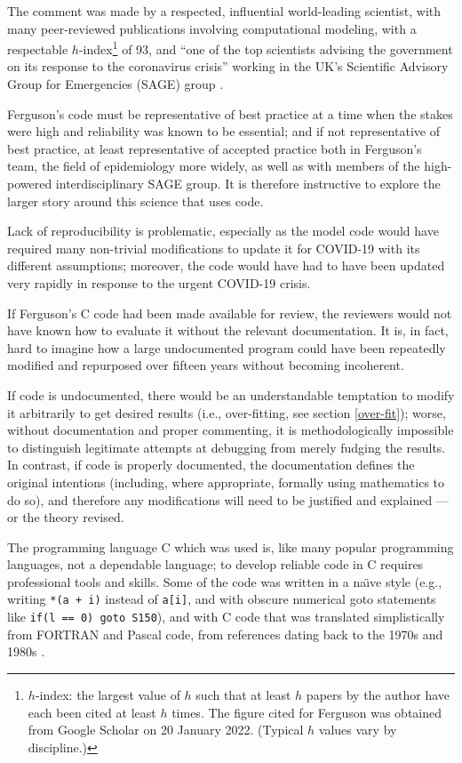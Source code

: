 \documentclass{comjnl}
\begin{document}
The comment was made by a respected, influential world-leading scientist, with many peer-reviewed publications involving computational modeling, with a respectable $h$-index\footnote{$h$-index: the largest value of $h$ such that at least $h$ papers by the author have each been cited at least $h$ times. The figure cited for Ferguson was obtained from Google Scholar on 20 January 2022. (Typical $h$ values vary by discipline.)} of 93, and ``one of the top scientists advising the government on its response to the coronavirus crisis'' working in the UK's Scientific Advisory Group for Emergencies (SAGE) group \cite{ferguson-resign}. 

Ferguson's code must be representative of best practice at a time when the stakes were high and reliability was known to be essential; and if not representative of best practice, at least representative of accepted practice both in Ferguson's team, the field of epidemiology more widely, as well as with members of the high-powered interdisciplinary SAGE group. It is therefore instructive to explore the larger story around this science that uses code. 

Lack of reproducibility is problematic, especially as the model code would have required many non-trivial modifications to update it for COVID-19 with its different assumptions; moreover, the code would have had to have been updated very rapidly in response to the urgent COVID-19 crisis. 

If Ferguson's C code had been made available for review, the reviewers would not have known how to evaluate it without the relevant documentation. It is, in fact, hard to imagine how a large undocumented program could have been repeatedly modified and repurposed over fifteen years without becoming incoherent. 

If code is undocumented, there would be an understandable temptation to modify it arbitrarily to get desired results (i.e., over-fitting, see section \ref{over-fit}); worse, without documentation and proper commenting, it is methodologically impossible to distinguish legitimate attempts at debugging from merely fudging the results. In contrast, if code is properly documented, the documentation defines the original intentions (including, where appropriate, formally using mathematics to do so), and therefore any modifications will need to be justified and explained --- or the theory revised.

The programming language C which was used \cite{tweet} is, like many popular programming languages, not a dependable language; to develop reliable code in C requires professional tools and skills. Some of the code was written in a na\"\i ve style (e.g., writing \texttt{*(a + i)} instead of \texttt{a[i]}, and with obscure numerical goto statements like \texttt{if(l == 0) goto S150}), and with C code that was translated simplistically from FORTRAN and Pascal code, from references dating back to the 1970s and 1980s .
\end{document}
